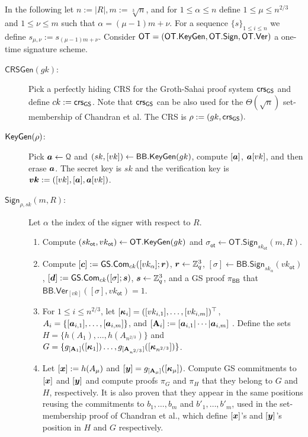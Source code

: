 In the following let $n:=|R|, m:=\sqrt[3]{n}$, and for $1\leq \alpha\leq n$ define $1\leq \mu \leq n^{2/3}$ and $1\leq \nu\leq m$ such that $\alpha=(\mu-1)m+\nu$. For a sequence $\{s\}_{1\leq i\leq n}$ we define $s_{\mu,\nu}:=s_{(\mu-1)m+\nu}$. Consider $\mathsf{OT}=(\mathsf{OT}.\mathsf{KeyGen},\mathsf{OT}.\mathsf{Sign},\allowbreak\mathsf{OT}.\mathsf{Ver})$ a one-time signature scheme.

\begin{description}
\item[$\mathsf{CRSGen}(gk)$:] Pick a perfectly hiding CRS for the Groth-Sahai proof system $\mathsf{crs}_{\mathsf{GS}}$ and define $ck:=\mathsf{crs}_{\mathsf{GS}}$. Note that $\mathsf{crs}_{\mathsf{GS}}$ can be also used for the $\Theta(\sqrt{n})$ set-membership of Chandran et al. The CRS is $\rho:=(gk,\mathsf{crs}_{\mathsf{GS}}).$

\item[$\mathsf{KeyGen}(\rho)$:] Pick ${\boldsymbol{a}}\gets\mathcal{Q}$ and $(sk,[vk])\gets\mathsf{BB}.\mathsf{KeyGen}(gk)$, compute $[{\boldsymbol{a}}]$, ${\boldsymbol{a}}[vk]$, and then erase ${\boldsymbol{a}}$. The secret key is $sk$ and the verification key is ${\boldsymbol{vk}}:=([vk],[{\boldsymbol{a}}],{\boldsymbol{a}}[vk])$.

\item[$\mathsf{Sign}_{\rho,sk}(m,R)$:] Let $\alpha$ the index of the signer with respect to $R$.
\begin{enumerate}
\item Compute $(sk_\mathsf{ot},vk_\mathsf{ot})\gets\mathsf{OT}.\mathsf{KeyGen}(gk)$ and $\sigma_\mathsf{ot}\gets\allowbreak\mathsf{OT}.\allowbreak\mathsf{Sign}_{sk_\mathsf{ot}}(m,R)$.

\item Compute $[{\boldsymbol{c}}]:={\mathsf{GS}}.\mathsf{Com}_{ck}([vk_\alpha];{\boldsymbol{r}})$, ${\boldsymbol{r}}\gets\mathbb{Z}_q^3$, $[\sigma]\gets\mathsf{BB}.\mathsf{Sign}_{sk_\alpha}(vk_\mathsf{ot})$, $[{\boldsymbol{d}}]:={\mathsf{GS}}.\mathsf{Com}_{ck}([\sigma];{\boldsymbol{s}})$, ${\boldsymbol{s}}\gets\mathbb{Z}_q^3$, and a GS proof $\pi_\mathsf{BB}$ that $\mathsf{BB}.\mathsf{Ver}_{[vk]}(\allowbreak[\sigma],vk_\mathsf{ot})=1$.

\item For $1\leq i \leq n^{2/3}$, let $[{\boldsymbol{\kappa}}_i]=([vk_{i,1}],\ldots,[vk_{i,m}])^\top$, $A_i=\{[{\boldsymbol{a}}_{i,1}],\allowbreak\ldots,\allowbreak[{\boldsymbol{a}}_{i,m}]\}$, and $[\mathbf{{A}}_i]:=[{\boldsymbol{a}}_{i,1}|\cdots|{\boldsymbol{a}}_{i,m}]$ . Define the sets
$H=\{h(A_1),\allowbreak\ldots,\allowbreak h(A_{n^{2/3}})\}$ and
$G=\{
	g_{[\mathbf{{A}}_1]}([{\boldsymbol{\kappa}}_1])
	\allowbreak\ldots,\allowbreak
	g_{[\mathbf{{A}}_{n^{2/3}}]}([{\boldsymbol{\kappa}}_{n^{2/3}}])\}$.

\item Let $[{\boldsymbol{x}}]:=h(A_\mu)$ and $[{\boldsymbol{y}}]=g_{[\mathbf{{A}}_\mu]}([{\boldsymbol{\kappa}}_\mu])$. Compute GS commitments to $[{\boldsymbol{x}}]$ and $[{\boldsymbol{y}}]$ and compute proofs $\pi_G$ and $\pi_H$ that they belong to $G$ and $H$, respectively. It is also proven that they appear in the same positions reusing the commitments to $b_1,\ldots,b_{m}$ and $b'_1,\ldots,b'_{m}$, used in the set-membership proof of Chandran et al., which define $[{\boldsymbol{x}}]$'s and $[{\boldsymbol{y}}]$'s position in $H$ and $G$ respectively.


\end{enumerate}
\end{description}
